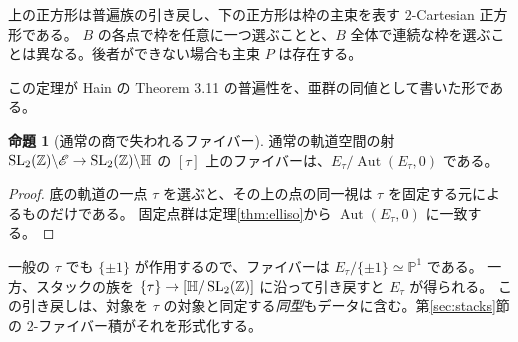 \documentclass[dvipdfmx,a4paper,11pt]{article}
\theoremstyle{definition}
\newtheorem{prop}[thm]{命題}
\newcommand{\PP}{\mathbb P}\newcommand{\HH}{\mathbb H}
\DeclareMathOperator{\Aut}{Aut}\DeclareMathOperator{\Pic}{Pic}\DeclareMathOperator{\Hom}{Hom}
\DeclareMathOperator{\SL}{SL}\DeclareMathOperator{\PGL}{PGL}\DeclareMathOperator{\PSL}{PSL}
\begin{document}
\par\medskip
\noindent\begin{minipage}{\linewidth}
\begin{center}
\end{center}
上の正方形は普遍族の引き戻し、下の正方形は枠の主束を表す $2$-Cartesian 正方形である。
$B$ の各点で枠を任意に一つ選ぶことと、$B$ 全体で連続な枠を選ぶことは異なる。後者ができない場合も主束 $P$ は存在する。
\end{minipage}\par\medskip

この定理が Hain の Theorem 3.11 の普遍性を、亜群の同値として書いた形である。

\begin{prop}[通常の商で失われるファイバー]
通常の軌道空間の射 $\SL_2(\Z)\backslash\mathscr E\to\SL_2(\Z)\backslash\HH$ の $[\tau]$ 上のファイバーは、$E_\tau/\Aut(E_\tau,0)$ である。
\end{prop}
\begin{proof}
底の軌道の一点 $\tau$ を選ぶと、その上の点の同一視は $\tau$ を固定する元によるものだけである。
固定点群は定理\ref{thm:elliso}から $\Aut(E_\tau,0)$ に一致する。
\end{proof}
一般の $\tau$ でも $\{\pm1\}$ が作用するので、ファイバーは $E_\tau/\{\pm1\}\simeq\PP^1$ である。
一方、スタックの族を $\{\tau\}\to[\HH/\SL_2(\Z)]$ に沿って引き戻すと $E_\tau$ が得られる。
この引き戻しは、対象を $\tau$ の対象と同定する\emph{同型}もデータに含む。第\ref{sec:stacks}節の $2$-ファイバー積がそれを形式化する。
\end{document}
